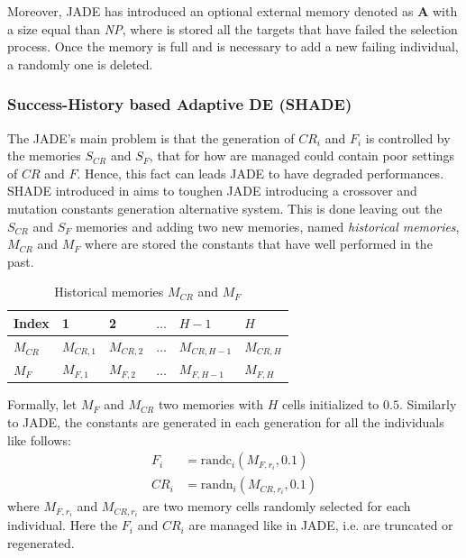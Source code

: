 Moreover, JADE has introduced an optional external memory denoted as \textbf{A} with a size equal than \textit{NP}, where is stored all the targets that have failed the selection process. Once the memory is full and is necessary to add a new failing individual, a randomly one is deleted.

\subsubsection{Success-History based Adaptive DE (SHADE)}
The JADE's main problem is that the generation of $\textit{CR}_{i}$ and $F_{i}$ is controlled by the memories $S_{\textit{CR}}$ and $S_{F}$, that for how are managed could contain poor settings of $\textit{CR}$ and $F$. Hence, this fact can leads JADE to have degraded performances.\newline\newline
SHADE introduced in \cite{SHADE:2013} aims to toughen JADE introducing a crossover and mutation constants generation alternative system. This is done leaving out the $S_{\textit{CR}}$ and $S_{F}$ memories and adding two new memories, named \textit{historical memories}, $M_{\textit{CR}}$ and $M_{F}$ where are stored the constants that have well performed in the past.
\begin{table}[h]
	\centering
	\begin{tabular}{|l|l|l|l|l|l|}
		\hline
		Index             & 1                   & 2                   & $\dots$ & $H -1$                & $H$                 \\ 
		\hline
		$M_{\textit{CR}}$ & $M_{\textit{CR},1}$ & $M_{\textit{CR},2}$ & $\dots$ & $M_{\textit{CR},H-1}$ & $M_{\textit{CR},H}$ \\ 
		\hline
		$M_{F}$           & $M_{F, 1}$          & $M_{F, 2}$          & $\dots$ & $M_{F, H-1}$          & $M_{F, H}$          \\ 
		\hline
	\end{tabular}
	\caption{Historical memories $M_{\textit{CR}}$ and $M_{F}$}
\end{table}
Formally, let $M_{F}$ and $M_{\textit{CR}}$ two memories with $H$ cells initialized to $0.5$. Similarly to JADE, the constants are generated in each generation for all the individuals like follows:
\begin{align}
	F_i &= \textrm{randc}_{i}(M_{F, r_{i}}, 0.1) \\
	\textit{CR}_i &= \textrm{randn}_{i}(M_{\textit{CR},r_{i}}, 0.1)
\end{align}
where $M_{F, r_{i}}$ and $M_{\textit{CR}, r_{i}}$ are two memory cells randomly selected for each individual. Here the $F_{i}$ and $\textit{CR}_{i}$ are managed like in JADE, i.e. are truncated or regenerated.\newline\newline
